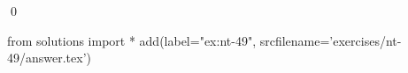 
\begin{ex} 
  \label{ex:nt-49}
  
  \qed
\end{ex} 
\begin{python0}
from solutions import *
add(label="ex:nt-49",
    srcfilename='exercises/nt-49/answer.tex') 
\end{python0}
